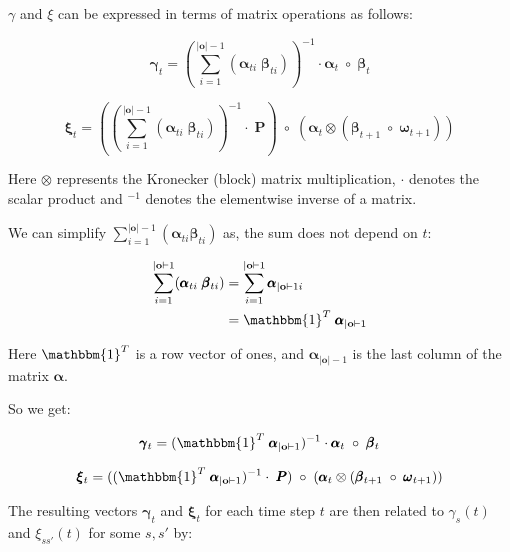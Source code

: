 $\gamma$ and $\xi$ can be expressed in terms of matrix operations as follows:

\begin{equation}
\pmb{\gamma}
    _t = (\sum_{i=1}^{|\mathbf{o}|-1} (\pmb{\alpha}_{t i} \;\pmb{\beta}_{t i}))^{-1} \cdot \pmb{\alpha}_t \; \circ \; \pmb{\beta}_t
    \label{eq:gamma-matrix}
\end{equation}

\begin{equation}
\pmb{\xi}
    _t = ((\sum_{i=1}^{|\mathbf{o}|-1} (\pmb{\alpha}_{t i} \; \pmb{\beta}_{t i}))^{-1} \cdot \; \pmb{P}) \; \circ \;(\pmb{\alpha}_t \otimes (\pmb{\beta}_{t+1} \; \circ \; \pmb{\omega}_{t+1}))
    \label{eq:xi-matrix}
\end{equation}

Here $\otimes$ represents the Kronecker (block) matrix multiplication, $\cdot$ denotes the scalar product and $^{-1}$ denotes the elementwise inverse of a matrix.

We can simplify $\sum_{i=1}^{|\mathbf{o}|-1} (\pmb{\alpha}_{t i} \pmb{\beta}_{t i})$ as, the sum does not depend on $t$:

\begin{align}
    \sum_{i=1}^{|\mathbf{o}|-1} (\pmb{\alpha}_{t i} \; \pmb{\beta}_{t i}) &= \sum_{i=1}^{|\mathbf{o}|-1} \pmb{\alpha}_{|\mathbf{o}|-1 i} \\
    &= \mathbbm{1}^T \; \pmb{\alpha}_{|\mathbf{o}|-1}
\end{align}

Here $\mathbbm{1}^T$ is a row vector of ones, and $\pmb{\alpha}_{|\mathbf{o}|-1}$ is the last column of the matrix $\pmb{\alpha}$.

So we get:

\begin{equation}
\pmb{\gamma}
    _t = (\mathbbm{1}^T \; \pmb{\alpha}_{|\mathbf{o}|-1})^{-1} \cdot \pmb{\alpha}_t \; \circ \; \pmb{\beta}_t
    \label{eq:gamma-matrix-ones}
\end{equation}

\begin{equation}
\pmb{\xi}
    _t = ((\mathbbm{1}^T \; \pmb{\alpha}_{|\mathbf{o}|-1})^{-1} \cdot \; \pmb{P}) \; \circ \;(\pmb{\alpha}_t \otimes (\pmb{\beta}_{t+1} \; \circ \; \pmb{\omega}_{t+1}))
    \label{eq:xi-matrix-ones}
\end{equation}

The resulting vectors $\pmb{\gamma}_t$ and $\pmb{\xi}_t$ for each time step $t$ are then related to $\gamma_s(t)$ and $\xi_{ss'}(t)$ for some $s, s'$ by:

